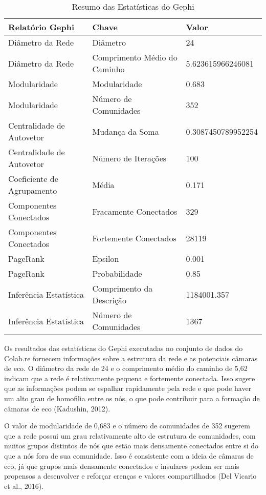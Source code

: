 \begin{table}[h]
    \centering
    \caption{Resumo das Estatísticas do Gephi}
    \begin{tabular}{|l|l|l|}
    \hline
    \textbf{Relatório Gephi} & \textbf{Chave} & \textbf{Valor} \\
    \hline
    Diâmetro da Rede & Diâmetro & 24 \\
    Diâmetro da Rede & Comprimento Médio do Caminho & 5.623615966246081 \\
    Modularidade & Modularidade & 0.683 \\
    Modularidade & Número de Comunidades & 352 \\
    Centralidade de Autovetor & Mudança da Soma & 0.3087450789952254 \\
    Centralidade de Autovetor & Número de Iterações & 100 \\
    Coeficiente de Agrupamento & Média & 0.171 \\
    Componentes Conectados & Fracamente Conectados & 329 \\
    Componentes Conectados & Fortemente Conectados & 28119 \\
    PageRank & Epsilon & 0.001 \\
    PageRank & Probabilidade & 0.85 \\
    Inferência Estatística & Comprimento da Descrição & 1184001.357 \\
    Inferência Estatística & Número de Comunidades & 1367 \\
    \hline
    \end{tabular}
\end{table}

Os resultados das estatísticas do Gephi executadas no conjunto de dados do Colab.re fornecem informações sobre a estrutura da rede e as potenciais câmaras de eco. O diâmetro da rede de 24 e o comprimento médio do caminho de 5,62 indicam que a rede é relativamente pequena e fortemente conectada. Isso sugere que as informações podem se espalhar rapidamente pela rede e que pode haver um alto grau de homofilia entre os nós, o que pode contribuir para a formação de câmaras de eco (Kadushin, 2012).

O valor de modularidade de 0,683 e o número de comunidades de 352 sugerem que a rede possui um grau relativamente alto de estrutura de comunidades, com muitos grupos distintos de nós que estão mais densamente conectados entre si do que a nós fora de sua comunidade. Isso é consistente com a ideia de câmaras de eco, já que grupos mais densamente conectados e insulares podem ser mais propensos a desenvolver e reforçar crenças e valores compartilhados (Del Vicario et al., 2016).

